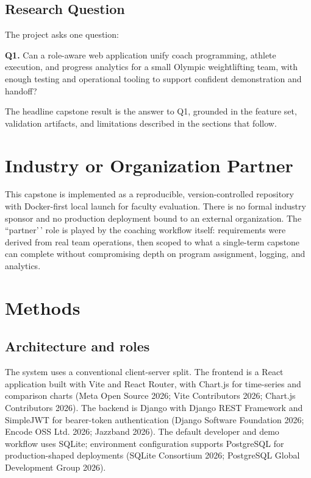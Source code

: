 \documentclass[
  letterpaper,
  DIV=11,
  numbers=noendperiod]{scrartcl}
\begin{document}
\subsection{Research Question}\label{research-question}

The project asks one question:

\textbf{Q1.} Can a role-aware web application unify coach programming,
athlete execution, and progress analytics for a small Olympic
weightlifting team, with enough testing and operational tooling to
support confident demonstration and handoff?

The headline capstone result is the answer to Q1, grounded in the
feature set, validation artifacts, and limitations described in the
sections that follow.

\section{Industry or Organization
Partner}\label{industry-or-organization-partner}

This capstone is implemented as a reproducible, version-controlled
repository with Docker-first local launch for faculty evaluation. There
is no formal industry sponsor and no production deployment bound to an
external organization. The ``partner'\,' role is played by the coaching
workflow itself: requirements were derived from real team operations,
then scoped to what a single-term capstone can complete without
compromising depth on program assignment, logging, and analytics.

\section{Methods}\label{methods}

\subsection{Architecture and roles}\label{architecture-and-roles}

The system uses a conventional client-server split. The frontend is a
React application built with Vite and React Router, with Chart.js for
time-series and comparison charts (Meta Open Source 2026; Vite
Contributors 2026; Chart.js Contributors 2026). The backend is Django
with Django REST Framework and SimpleJWT for bearer-token authentication
(Django Software Foundation 2026; Encode OSS Ltd. 2026; Jazzband 2026).
The default developer and demo workflow uses SQLite; environment
configuration supports PostgreSQL for production-shaped deployments
(SQLite Consortium 2026; PostgreSQL Global Development Group 2026).
\end{document}
